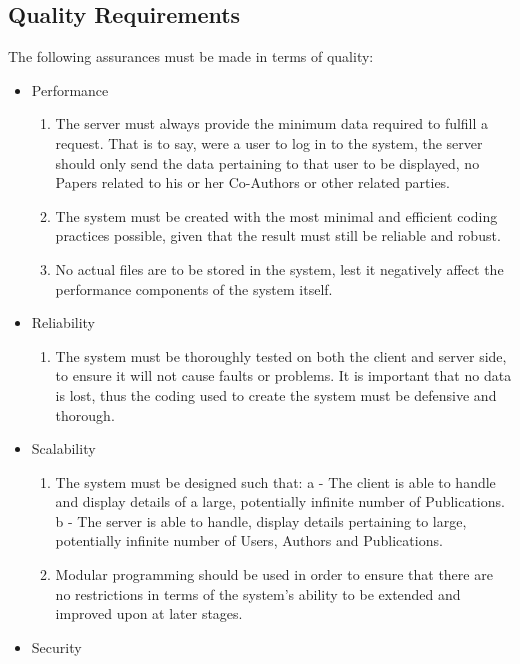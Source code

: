 \documentclass[hidelinks,a4paper,12pt]{article}
\begin{document}
	\subsection{Quality Requirements}
	The following assurances must be made in terms of quality:
	\begin{itemize}
		\item Performance
		\begin{enumerate}
			\item The server must always provide the minimum data required to fulfill a request. That is to say, were a user to log in to the system, the server should only send the data pertaining to that user to be displayed, no Papers related to his or her Co-Authors or other related parties. 
			\item The system must be created with the most minimal and efficient coding practices possible, given that the result must still be reliable and robust.
			\item No actual files are to be stored in the system, lest it negatively affect the performance components of the system itself.
		\end{enumerate}
		\item Reliability
		\begin{enumerate}
			\item The system must be thoroughly tested on both the client and server side, to ensure it will not cause faults or problems. It is important that no data is lost, thus the coding used to create the system must be defensive and thorough.
		\end{enumerate}
		\newpage
		\item Scalability
		\begin{enumerate}
			\item The system must be designed such that:
			\newline
	 a - The client is able to handle and display details of a large, potentially infinite number of Publications.\newline
				b - The server is able to handle, display details pertaining to large, potentially infinite number of Users, Authors and Publications.	
			\item Modular programming should be used in order to ensure that there are no restrictions in terms of the system's ability to be extended and improved upon at later stages.
		\end{enumerate}
		\item Security
		\begin{enumerate}

\end{enumerate}
\end{itemize}
\end{document}
